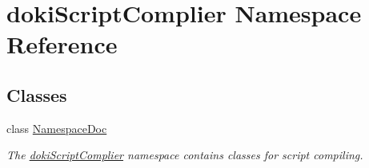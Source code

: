 \hypertarget{namespacedoki_script_complier}{}\section{doki\+Script\+Complier Namespace Reference}
\label{namespacedoki_script_complier}
\subsection*{Classes}
\begin{DoxyCompactItemize}
\item 
class \hyperlink{classdoki_script_complier_1_1_namespace_doc}{Namespace\+Doc}
\begin{DoxyCompactList}\small\item\em The \hyperlink{namespacedoki_script_complier}{doki\+Script\+Complier} namespace contains classes for script compiling. \end{DoxyCompactList}\end{DoxyCompactItemize}
